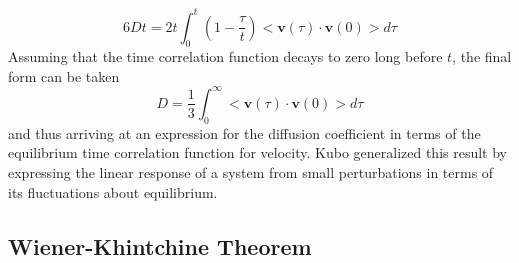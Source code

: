 \documentclass[aps,prb,preprint,preprintnumbers,amsmath,amssymb,floatfix,superscriptaddress]{revtex4}
\begin{document}
%
\begin{equation}
6Dt=2t\int_0^t\left(1-\frac{\tau}{t}\right)<\pmb{v}(\tau)\cdot\pmb{v}(0)>d\tau
\end{equation}
%
Assuming that the time correlation function decays to zero long before $t$, the final form can be taken
%
\begin{equation}
D=\frac{1}{3}\int_0^{\infty}<\pmb{v}(\tau)\cdot\pmb{v}(0)>d\tau
\end{equation}
%
and thus arriving at an expression for the diffusion coefficient in terms of the equilibrium time correlation function for velocity. Kubo generalized this result by expressing the linear response of a system from small perturbations in terms of its fluctuations about equilibrium.

\subsection*{Wiener-Khintchine Theorem}
\end{document}
